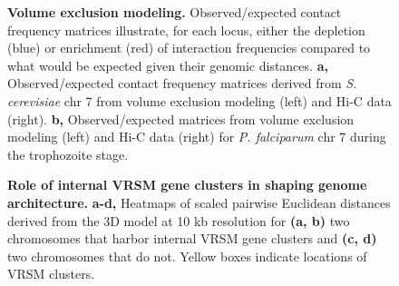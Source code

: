 \documentclass[10pt]{article}
\begin{document}
\begin{figure}[h]
\centering
\caption{{\bf Volume exclusion modeling. }
Observed/expected contact frequency matrices illustrate, for each locus, either the depletion (blue) or enrichment (red) of interaction frequencies compared to what would be expected given their genomic distances. \textbf{a,} Observed/expected contact frequency matrices derived from {\em S. cerevisiae} chr 7 from volume exclusion modeling (left) and Hi-C data (right). \textbf{b,} Observed/expected matrices from volume exclusion modeling (left) and Hi-C data (right) for {\em P. falciparum} chr 7 during the trophozoite stage.}
\label{fig:fig4}
\end{figure}


\begin{figure}[h]
\centering
\caption{{\bf Role of internal VRSM gene clusters in shaping genome architecture.}
 \textbf{a-d,} Heatmaps of scaled pairwise Euclidean distances derived from the 3D model at 10 kb resolution for \textbf{(a, b)} two chromosomes that harbor internal VRSM gene clusters and \textbf{(c, d)} two chromosomes that do not. Yellow boxes indicate locations of VRSM clusters. }
\label{fig:fig5}
\end{figure}
\end{document}
